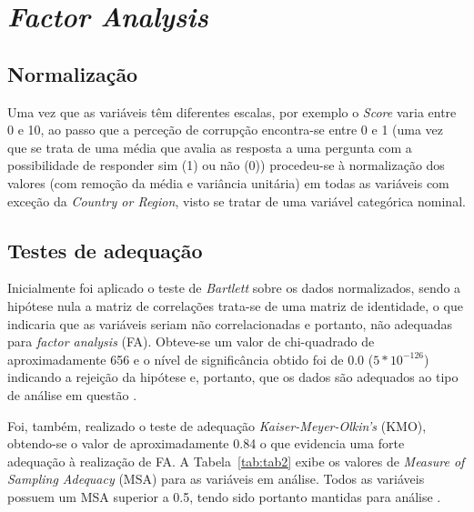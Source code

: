 \documentclass[12pt, a4paper]{article}
\begin{document}


\section{\emph{Factor Analysis}} %
\label{sec:factor_analisys}

\subsection{Normalização} %
\label{sub:normalização}

Uma vez que as variáveis têm diferentes escalas, por exemplo o
\emph{Score} varia entre 0 e 10, ao passo que a perceção de corrupção
encontra-se entre 0 e 1 (uma vez que se trata de uma média que avalia as
resposta a uma pergunta com a possibilidade de responder sim (1) ou não
(0)) procedeu-se à normalização dos valores (com remoção da média e
variância unitária) em todas as variáveis com exceção da \emph{Country
or Region}, visto se tratar de uma variável categórica nominal.


\subsection{Testes de adequação} %
\label{sub:testes_de_adequação}

Inicialmente foi aplicado o teste de \emph{Bartlett} sobre os dados
normalizados, sendo a hipótese nula a matriz de correlações trata-se de
uma matriz de identidade, o que indicaria que as variáveis seriam não
correlacionadas e portanto, não adequadas para \emph{factor analysis}
(FA).
Obteve-se um valor de chi-quadrado de aproximadamente 656 e o nível de
significância obtido foi de 0.0 (\(5*10^{-126}\)) indicando a rejeição
da hipótese e, portanto, que os dados são adequados ao tipo de análise
em questão \cite{kaiser}.

Foi, também, realizado o teste
de adequação \emph{Kaiser-Meyer-Olkin's} (KMO), obtendo-se o valor de
aproximadamente 0.84 o que evidencia uma forte adequação à realização de
FA. A Tabela~\ref{tab:tab2} exibe os valores de \emph{Measure of Sampling
Adequacy} (MSA) para as variáveis em análise. Todos as variáveis possuem
um MSA superior a 0.5, tendo sido portanto mantidas para análise \cite{kaiser}.
\end{document}
